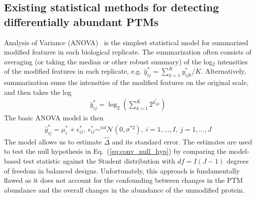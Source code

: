 \documentclass[mcp]{article}
\numberwithin{table}{section}
\def\eqref#1{Eq.~(\ref{eq:#1})}
\begin{document}
\subsection*{Existing statistical methods for detecting differentially abundant PTMs}


\medskip \noindent 

Analysis of Variance (ANOVA)~\cite{kutner_etal_04a} is the simplest statistical model for summarized modified features in each biological replicate. The summarization often consists of averaging (or taking the median or other robust summary) of the log$_2$ intensities of the modified features in each replicate, e.g. $\hat{y}^*_{ij} = \sum_{k=1}^K{y_{ijk}^{\ast}}/K$. Alternatively, summarization sums the intensities of the modified features on the original scale, and then takes the log
\begin{eqnarray}
\hat{y}^*_{ij} =  \log_2 \left(\sum_{k=1}^{K} 2^{y_{ijk}^{\ast}}\right)
\label{eq:anova_summ}
\end{eqnarray}
The basic ANOVA model  is then
\begin{eqnarray}
\hat{y}^*_{ij} = \mu^{*}_{i} + \epsilon^{\ast}_{ij}, \ \epsilon^{\ast}_{ij} \mathop\sim^{iid} \mathcal{N}(0, \sigma^{*2}),\ i=1,\ldots,I,\ j=1,\ldots,J
\label{eq:ttest_model}
\end{eqnarray}
The model allows us to estimate $\hat{\Delta}$ and its standard error. The estimates are used to test the null hypothesis in \eqref{conv_null_hyp} by comparing the model-based test statistic against the Student distribution with $df=I(J-1)$ degrees of freedom in balanced designs.
Unfortunately, this approach is fundamentally flawed as it does not account for the confounding between changes in the PTM abundance and the overall changes in the abundance of the unmodified protein.

\medskip \noindent 

\end{document}

